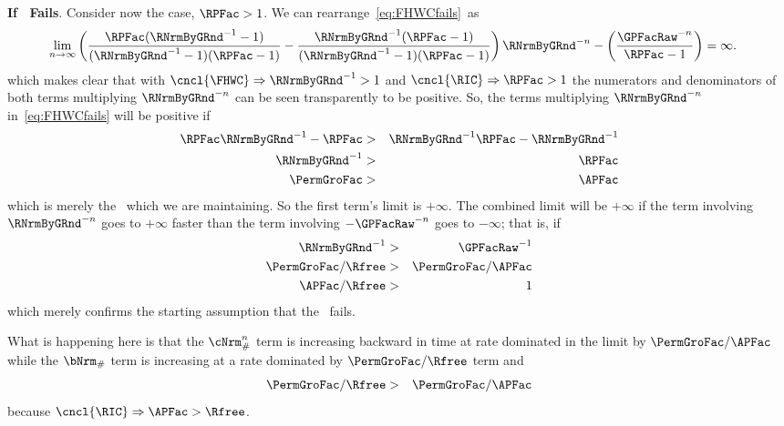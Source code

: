 \documentclass[\econtexRoot/BufferStockTheory]{subfiles}
\begin{document}
\noindent \textbf{If \RIC~Fails}.
Consider now the \cncl{\RIC} case, $\RPFac > 1$.
We can rearrange~\eqref{eq:FHWCfails}~as
\begin{eqnarray}
  \lim_{n \rightarrow \infty} \left(\frac{\RPFac(\RNrmByGRnd^{-1}-1)}{(\RNrmByGRnd^{-1}-1)(\RPFac-1)}-\frac{\RNrmByGRnd^{-1}(\RPFac-1)}{(\RNrmByGRnd^{-1}-1)(\RPFac-1)}\right)\RNrmByGRnd^{-n}-\left(\frac{\GPFacRaw^{-n}}{\RPFac-1}\right)  & = \infty.  
\end{eqnarray}
which makes clear that with $\cncl{\FHWC} \Rightarrow \RNrmByGRnd^{-1} > 1$ and $\cncl{\RIC} \Rightarrow \RPFac > 1$ the numerators and denominators of both terms multiplying $\RNrmByGRnd^{-n}$ can be seen transparently to be positive.
So, the terms multiplying
$\RNrmByGRnd^{-n}$ in~\eqref{eq:FHWCfails} will be positive if
\begin{eqnarray*}
  \RPFac \RNrmByGRnd^{-1} - \RPFac  & > & \RNrmByGRnd^{-1}\RPFac-\RNrmByGRnd^{-1}
  \\ \RNrmByGRnd^{-1}  & > & \RPFac
  \\ \PermGroFac  & > & \APFac
\end{eqnarray*}
which is merely the \GICRaw~which we are maintaining.
So the first term's limit is $+\infty$.
The
combined limit will be $+\infty$ if the term involving $\RNrmByGRnd^{-n}$
goes to $+\infty$ faster than the term involving $-\GPFacRaw^{-n}$ goes to
$-\infty$; that is, if
\begin{eqnarray*}
  \RNrmByGRnd^{-1}  & > & \GPFacRaw^{-1}
  \\ \PermGroFac/\Rfree  & > & \PermGroFac/\APFac
  \\ \APFac/\Rfree  & > & 1
\end{eqnarray*}
which merely confirms the starting assumption that the \RIC~fails.

What is happening here is that the $\cNrm_{\#}^{n}$ term is increasing backward in time at rate dominated in the limit by $\PermGroFac/\APFac$ while the $\bNrm_{\#}$ term is increasing at a rate dominated by $\PermGroFac/\Rfree$ term and
\begin{eqnarray}
  \PermGroFac/\Rfree & > & \PermGroFac/\APFac 
\end{eqnarray}
because $\cncl{\RIC} \Rightarrow \APFac > \Rfree$.
\end{document}
